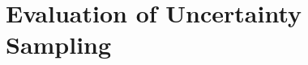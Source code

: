 \section{Evaluation of Uncertainty Sampling}
\label{ch:evaluation:sec:evaluation_uncertainty}







